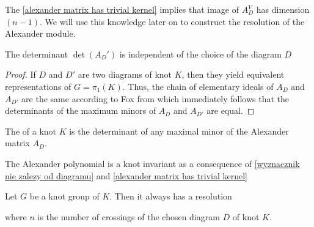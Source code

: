 The \cref{alexander matrix has trivial kernel} implies that image of $A_D^V$ has dimension $(n-1)$. We will use this knowledge later on to construct the resolution of the Alexander module.

\begin{theorem}\label{wyznacznik nie zalezy od diagramu}
  The determinant $\det(A_D')$ is independent of the choice of the diagram $D$
\end{theorem}

\begin{proof}\color{red}
  If $D$ and $D'$ are two diagrams of knot $K$, then they yield equivalent representations of $G=\pi_1(K)$. Thus, the chain of elementary ideals of $A_D$ and $A_{D'}$ are the same according to Fox \cite[Chapter~VII]{fox} from which immediately follows that the determinants of the maximum minors of $A_D$ and $A_{D'}$ are equal.
\end{proof}

\begin{definition}
  The  of a knot $K$ is the determinant of any maximal minor of the Alexander matrix $A_D$.
\end{definition}

The Alexander polynomial is a knot invariant as a consequence of \cref{wyznacznik nie zalezy od diagramu} and \cref{alexander matrix has trivial kernel}

\begin{proposition}
  Let $G$ be a knot group of $K$. Then it always has a resolution
  \begin{center}
  \end{center}
  where $n$ is the number of crossings of the chosen diagram $D$ of knot $K$.
\end{proposition}

